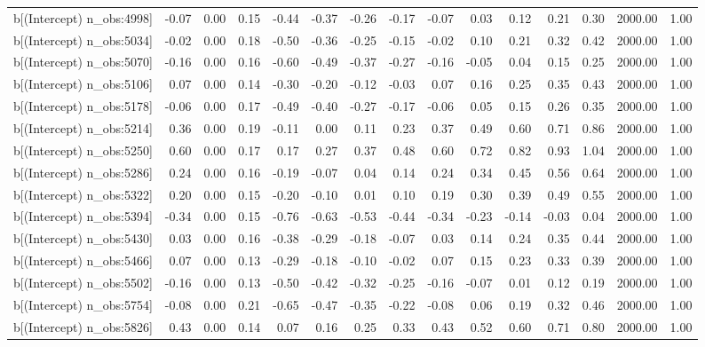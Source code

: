 \begin{table}[ht]
\begin{tabular}{rrrrrrrrrrrrrrr}
  b[(Intercept) n\_obs:4998] & -0.07 & 0.00 & 0.15 & -0.44 & -0.37 & -0.26 & -0.17 & -0.07 & 0.03 & 0.12 & 0.21 & 0.30 & 2000.00 & 1.00 \\ 
  b[(Intercept) n\_obs:5034] & -0.02 & 0.00 & 0.18 & -0.50 & -0.36 & -0.25 & -0.15 & -0.02 & 0.10 & 0.21 & 0.32 & 0.42 & 2000.00 & 1.00 \\ 
  b[(Intercept) n\_obs:5070] & -0.16 & 0.00 & 0.16 & -0.60 & -0.49 & -0.37 & -0.27 & -0.16 & -0.05 & 0.04 & 0.15 & 0.25 & 2000.00 & 1.00 \\ 
  b[(Intercept) n\_obs:5106] & 0.07 & 0.00 & 0.14 & -0.30 & -0.20 & -0.12 & -0.03 & 0.07 & 0.16 & 0.25 & 0.35 & 0.43 & 2000.00 & 1.00 \\ 
  b[(Intercept) n\_obs:5178] & -0.06 & 0.00 & 0.17 & -0.49 & -0.40 & -0.27 & -0.17 & -0.06 & 0.05 & 0.15 & 0.26 & 0.35 & 2000.00 & 1.00 \\ 
  b[(Intercept) n\_obs:5214] & 0.36 & 0.00 & 0.19 & -0.11 & 0.00 & 0.11 & 0.23 & 0.37 & 0.49 & 0.60 & 0.71 & 0.86 & 2000.00 & 1.00 \\ 
  b[(Intercept) n\_obs:5250] & 0.60 & 0.00 & 0.17 & 0.17 & 0.27 & 0.37 & 0.48 & 0.60 & 0.72 & 0.82 & 0.93 & 1.04 & 2000.00 & 1.00 \\ 
  b[(Intercept) n\_obs:5286] & 0.24 & 0.00 & 0.16 & -0.19 & -0.07 & 0.04 & 0.14 & 0.24 & 0.34 & 0.45 & 0.56 & 0.64 & 2000.00 & 1.00 \\ 
  b[(Intercept) n\_obs:5322] & 0.20 & 0.00 & 0.15 & -0.20 & -0.10 & 0.01 & 0.10 & 0.19 & 0.30 & 0.39 & 0.49 & 0.55 & 2000.00 & 1.00 \\ 
  b[(Intercept) n\_obs:5394] & -0.34 & 0.00 & 0.15 & -0.76 & -0.63 & -0.53 & -0.44 & -0.34 & -0.23 & -0.14 & -0.03 & 0.04 & 2000.00 & 1.00 \\ 
  b[(Intercept) n\_obs:5430] & 0.03 & 0.00 & 0.16 & -0.38 & -0.29 & -0.18 & -0.07 & 0.03 & 0.14 & 0.24 & 0.35 & 0.44 & 2000.00 & 1.00 \\ 
  b[(Intercept) n\_obs:5466] & 0.07 & 0.00 & 0.13 & -0.29 & -0.18 & -0.10 & -0.02 & 0.07 & 0.15 & 0.23 & 0.33 & 0.39 & 2000.00 & 1.00 \\ 
  b[(Intercept) n\_obs:5502] & -0.16 & 0.00 & 0.13 & -0.50 & -0.42 & -0.32 & -0.25 & -0.16 & -0.07 & 0.01 & 0.12 & 0.19 & 2000.00 & 1.00 \\ 
  b[(Intercept) n\_obs:5754] & -0.08 & 0.00 & 0.21 & -0.65 & -0.47 & -0.35 & -0.22 & -0.08 & 0.06 & 0.19 & 0.32 & 0.46 & 2000.00 & 1.00 \\ 
  b[(Intercept) n\_obs:5826] & 0.43 & 0.00 & 0.14 & 0.07 & 0.16 & 0.25 & 0.33 & 0.43 & 0.52 & 0.60 & 0.71 & 0.80 & 2000.00 & 1.00 \\ 

\end{tabular}
\end{table}
